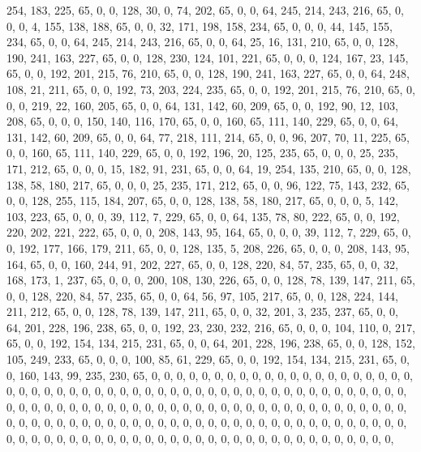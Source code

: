 \begin{DoxyCode}
       254, 183, 225, 65, 0, 0, 128, 30, 0, 74, 202, 65, 0, 0, 64, 245, 214, 243, 216, 65, 0, 0, 0, 4, 155, 138,
       188, 65, 0, 0, 32, 171, 198, 158, 234, 65, 0, 0, 0, 44, 145, 155, 234, 65, 0, 0, 64, 245, 214, 243, 216, 65,
       0, 0, 64, 25, 16, 131, 210, 65, 0, 0, 128, 190, 241, 163, 227, 65, 0, 0, 128, 230, 124, 101, 221, 65, 0, 0,
       0, 124, 167, 23, 145, 65, 0, 0, 192, 201, 215, 76, 210, 65, 0, 0, 128, 190, 241, 163, 227, 65, 0, 0, 64, 248,
       108, 21, 211, 65, 0, 0, 192, 73, 203, 224, 235, 65, 0, 0, 192, 201, 215, 76, 210, 65, 0, 0, 0, 219, 22,
       160, 205, 65, 0, 0, 64, 131, 142, 60, 209, 65, 0, 0, 192, 90, 12, 103, 208, 65, 0, 0, 0, 150, 140, 116, 170,
       65, 0, 0, 160, 65, 111, 140, 229, 65, 0, 0, 64, 131, 142, 60, 209, 65, 0, 0, 64, 77, 218, 111, 214, 65, 0, 0,
       96, 207, 70, 11, 225, 65, 0, 0, 160, 65, 111, 140, 229, 65, 0, 0, 192, 196, 20, 125, 235, 65, 0, 0, 0, 25,
       235, 171, 212, 65, 0, 0, 0, 15, 182, 91, 231, 65, 0, 0, 64, 19, 254, 135, 210, 65, 0, 0, 128, 138, 58, 180,
       217, 65, 0, 0, 0, 25, 235, 171, 212, 65, 0, 0, 96, 122, 75, 143, 232, 65, 0, 0, 128, 255, 115, 184, 207, 65,
       0, 0, 128, 138, 58, 180, 217, 65, 0, 0, 0, 5, 142, 103, 223, 65, 0, 0, 0, 39, 112, 7, 229, 65, 0, 0, 64,
       135, 78, 80, 222, 65, 0, 0, 192, 220, 202, 221, 222, 65, 0, 0, 0, 208, 143, 95, 164, 65, 0, 0, 0, 39, 112, 7,
       229, 65, 0, 0, 192, 177, 166, 179, 211, 65, 0, 0, 128, 135, 5, 208, 226, 65, 0, 0, 0, 208, 143, 95, 164, 65,
       0, 0, 160, 244, 91, 202, 227, 65, 0, 0, 128, 220, 84, 57, 235, 65, 0, 0, 32, 168, 173, 1, 237, 65, 0, 0, 0,
       200, 108, 130, 226, 65, 0, 0, 128, 78, 139, 147, 211, 65, 0, 0, 128, 220, 84, 57, 235, 65, 0, 0, 64, 56, 97,
       105, 217, 65, 0, 0, 128, 224, 144, 211, 212, 65, 0, 0, 128, 78, 139, 147, 211, 65, 0, 0, 32, 201, 3, 235,
       237, 65, 0, 0, 64, 201, 228, 196, 238, 65, 0, 0, 192, 23, 230, 232, 216, 65, 0, 0, 0, 104, 110, 0, 217, 65,
       0, 0, 192, 154, 134, 215, 231, 65, 0, 0, 64, 201, 228, 196, 238, 65, 0, 0, 128, 152, 105, 249, 233, 65, 0, 0,
       0, 100, 85, 61, 229, 65, 0, 0, 192, 154, 134, 215, 231, 65, 0, 0, 160, 143, 99, 235, 230, 65, 0, 0, 0, 0,
       0, 0, 0, 0, 0, 0, 0, 0, 0, 0, 0, 0, 0, 0, 0, 0, 0, 0, 0, 0, 0, 0, 0, 0, 0, 0, 0, 0, 0, 0, 0, 0, 0, 0, 0, 0,
       0, 0, 0, 0, 0, 0, 0, 0, 0, 0, 0, 0, 0, 0, 0, 0, 0, 0, 0, 0, 0, 0, 0, 0, 0, 0, 0, 0, 0, 0, 0, 0, 0, 0, 0, 0,
       0, 0, 0, 0, 0, 0, 0, 0, 0, 0, 0, 0, 0, 0, 0, 0, 0, 0, 0, 0, 0, 0, 0, 0, 0, 0, 0, 0, 0, 0, 0, 0, 0, 0, 0, 0,
       0, 0, 0, 0, 0, 0, 0, 0, 0, 0, 0, 0, 0, 0, 0, 0, 0, 0, 0, 0, 0, 0, 0, 0, 0, 0, 0, 0, 0, 0, 0, 0, 0, 0, 0, 0,

\end{DoxyCode}
